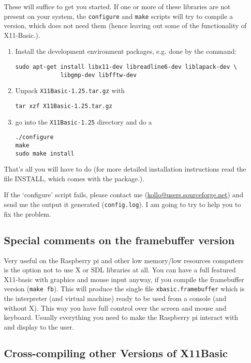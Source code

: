 These will suffice to get you started. If one or more of these libraries are
not present on your system, the \verb|configure| and \verb|make| scripts will
try to compile a version, which does not need them (hence leaving out some of
the functionality of X11-Basic.).

\begin{enumerate}
\item Install the development environment packages, e.g. done by the command:
\begin{verbatim}
sudo apt-get install libx11-dev libreadline6-dev liblapack-dev \
             libgmp-dev libfftw-dev 
\end{verbatim}

\item Unpack \verb|X11Basic-1.25.tar.gz| with 
\begin{verbatim}
tar xzf X11Basic-1.25.tar.gz
\end{verbatim}
\item go into the \verb|X11Basic-1.25| directory and do a 
\begin{verbatim}
./configure
make
sudo make install
\end{verbatim}
\end{enumerate}
That's all you will have to do (for more detailed installation instructions read
the file INSTALL, which comes with the package.).

If the `configure' script fails, please contact me
(\url{kollo@users.sourceforge.net}) and send me the output it generated
(\verb|config.log|). I am going to try to help you to fix the problem.

\subsection*{Special comments on the framebuffer version}

Very useful on the Raspberry pi and other low memory/low resources computers 
is the option not to use X or SDL libraries at all. You can have a full 
featured X11-basic with graphics and mouse input anyway, if you compile the 
framebuffer version (\verb|make fb|). This will produce the single file 
\verb|xbasic.framebuffer| which is the interpreter (and virtual machine) 
ready to be used from a console (and without X). This way you have full comtrol 
over the screen and mouse and keyboard. Usually everything you need to make the 
Raspberry pi interact with and display to the user. 

\subsection*{Cross-compiling other Versions of X11Basic}

